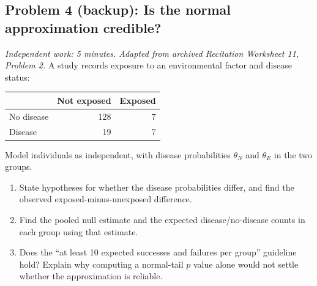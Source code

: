 \documentclass[11pt]{article}
\newcommand{\workingspace}[1]{}
\newcommand{\workingspace}[1]{\vspace{#1}}
\begin{document}
\subsection*{Problem 4 (backup): Is the normal approximation credible?}
\noindent\textit{Independent work: 5 minutes. Adapted from archived
Recitation Worksheet 11, Problem 2.}
A study records exposure to an environmental factor and disease status:
\begin{center}
\begin{tabular}{@{}lrr@{}}
\toprule & Not exposed & Exposed\\\midrule
No disease & 128 & 7\\
Disease & 19 & 7\\\bottomrule
\end{tabular}
\end{center}
Model individuals as independent, with disease probabilities
$\theta_N$ and $\theta_E$ in the two groups.
\begin{enumerate}
 \item State hypotheses for whether the disease probabilities differ, and
 find the observed exposed-minus-unexposed difference.
 \item Find the pooled null estimate and the expected disease/no-disease
 counts in each group using that estimate.
 \item Does the ``at least 10 expected successes and failures per group''
 guideline hold? Explain why computing a normal-tail $p$ value alone
 would not settle whether the approximation is reliable.
\end{enumerate}
\workingspace{9cm}
\end{document}
